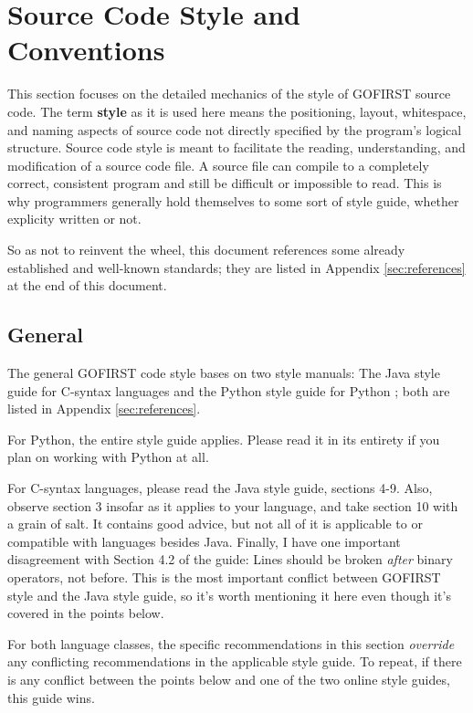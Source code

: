 \documentclass[12pt]{article}
\newcommand{\textdef}[1]{\textbf{#1}}
\begin{document}
\section{Source Code Style and Conventions}
\label{sec:codestyle}
This section focuses on the detailed mechanics of the style of GOFIRST source code. The term \textdef{style} as it is used here means the positioning, layout, whitespace, and naming aspects of source code not directly specified by the program's logical structure. Source code style is meant to facilitate the reading, understanding, and modification of a source code file. A source file can compile to a completely correct, consistent program and still be difficult or impossible to read. This is why programmers generally hold themselves to some sort of style guide, whether explicity written or not.

So as not to reinvent the wheel, this document references some already established and well-known standards; they are listed in Appendix \ref{sec:references} at the end of this document.

\subsection{General}
The general GOFIRST code style bases on two style manuals: The Java style guide for C-syntax languages \cite{javacon} and the Python style guide for Python \cite{pyguide}; both are listed in Appendix \ref{sec:references}.

For Python, the entire style guide applies. Please read it in its entirety if you plan on working with Python at all.

For C-syntax languages, please read the Java style guide, sections 4-9. Also, observe section 3 insofar as it applies to your language, and take section 10 with a grain of salt. It contains good advice, but not all of it is applicable to or compatible with languages besides Java. Finally, I have one important disagreement with Section 4.2 of the guide: Lines should be broken \emph{after} binary operators, not before. This is the most important conflict between GOFIRST style and the Java style guide, so it's worth mentioning it here even though it's covered in the points below.

For both language classes, the specific recommendations in this section \emph{override} any conflicting recommendations in the applicable style guide. To repeat, if there is any conflict between the points below and one of the two online style guides, this guide wins.
\end{document}
